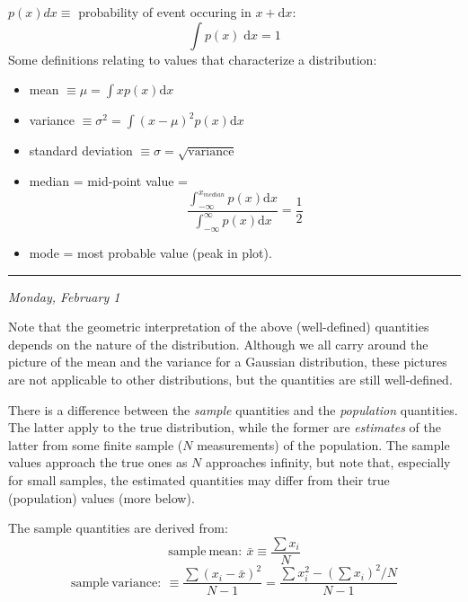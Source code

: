 \documentclass[12pt]{article}
\newcommand{\mydate}[1]{
    \begin{flushright}
        \rule{\textwidth}{0.4pt} %
        \footnotesize\hfill\textit{#1}
    \end{flushright}}
\begin{document}
$p(x)dx \equiv$ probability of event occuring in $x + \mathrm{d}x$:
\[
    \int{ p(x) \;\mathrm{d}x } = 1
    \]
Some definitions relating to values that characterize a distribution:
\begin{itemize}
    \item mean $ \equiv \mu = \int xp(x)\mathrm{d}x $
    \item variance $ \equiv \sigma^{2} = \int (x-\mu)^{2} p(x)\mathrm{d}x $
    \item standard deviation $\equiv \sigma = \sqrt{\mathrm{variance}} $ 
    \item median = mid-point value =
        \[
            \frac{ \int_{-\infty}^{x_{median}} p(x)\mathrm{d}x }
              { \int_{-\infty}^{\infty} p(x)\mathrm{d}x }
              = \frac{1}{2} 
              \]
    \item mode = most probable value (peak in plot).
\end{itemize}

\mydate{Monday, February 1}

Note that the geometric interpretation of the above (well-defined) quantities
depends on the nature of the distribution. Although we all carry around the
picture of the mean and the variance for a Gaussian distribution, these
pictures are not applicable to other distributions, but the quantities are
still well-defined.

There is a difference between the \emph{sample} quantities and the
\emph{population} quantities. The latter apply to the true distribution, while
the former are \emph{estimates} of the latter from some finite sample ($N$
measurements) of the population. The sample values approach the true ones as
$N$ approaches infinity, but note that, especially for small samples, the
estimated quantities may differ from their true (population) values (more
below).

The sample quantities are derived from:
\[
    \mathrm{sample\ mean:\ } \bar{x} \equiv \frac{\sum x_i}{N}
    \]
\[
    \mathrm{sample\ variance:\ } \equiv
    \frac{\sum (x_i-\bar{x})^{2}}{N-1} =
    \frac{\sum x_i^{2}-(\sum x_i)^{2}/N}{N-1}
    \]
\end{document}
